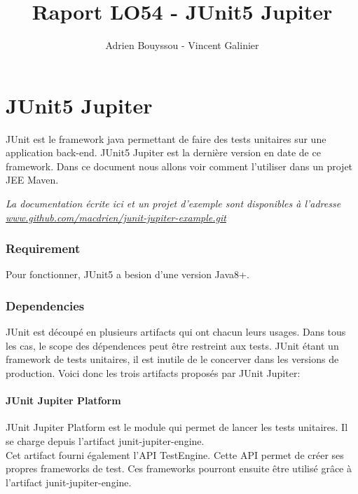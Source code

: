 \documentclass[12pt]{article}		%
\title{Raport LO54 - JUnit5 Jupiter}%
\author{Adrien Bouyssou - Vincent Galinier} %
\begin{document}
\tableofcontents 
\pagebreak
\part{JUnit5 Jupiter}

JUnit est le framework java permettant de faire des tests unitaires sur une application back-end. JUnit5 Jupiter est la dernière version en date de ce framework. Dans ce document nous allons voir comment l'utiliser dans un projet JEE Maven.

\vspace{0.5cm}

\textit{La documentation écrite ici et un projet d'exemple sont disponibles à l'adresse \href{www.github.com/macdrien/junit-jupiter-example.git}{www.github.com/macdrien/junit-jupiter-example.git}}

\section{Requirement}

Pour fonctionner, JUnit5 a besion d'une version Java8+.

\section{Dependencies}

JUnit est découpé en plusieurs artifacts qui ont chacun leurs usages. Dans tous les cas, le scope des dépendences peut être restreint aux tests. JUnit étant un framework de tests unitaires, il est inutile de le concerver dans les versions de production. Voici donc les trois artifacts proposés par JUnit Jupiter:

\subsection{JUnit Jupiter Platform}

JUnit Jupiter Platform est le module qui permet de lancer les tests unitaires. Il se charge depuis l'artifact junit-jupiter-engine. \\ Cet artifact fourni également l'API TestEngine. Cette API permet de créer ses propres frameworks de test. Ces frameworks pourront ensuite être utilisé grâce à l'artifact junit-jupiter-engine.
\end{document}
